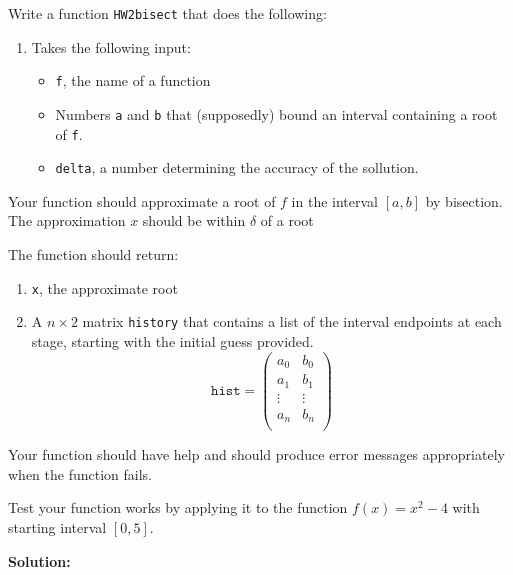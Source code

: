 \documentclass[12pt]{article}
\makeatletter
\theoremstyle{homework}
\newenvironment{exercise}[1]
{\def\@currentlabel{#1}\exercisecore}
{\endexercisecore}
\newcommand{\localhead}[1]{\par\smallskip\noindent\textbf{#1}\nobreak\\}%
\newcommand\solution{\localhead{Solution:}}
\makeatother
\begin{document}
\begin{exercise}{DM 4}
Write a function \texttt{HW2bisect} that does the following:
\begin{enumerate}
	\item Takes the following input:
	\begin{itemize}
		\item \texttt{f}, the name of a function
		\item Numbers \texttt{a} and \texttt{b} that (supposedly) bound an interval containing a root of \texttt{f}.
		\item \texttt{delta}, a number determining the accuracy of the sollution.
	\end{itemize}
\end{enumerate}
Your function should approximate a root of $f$ in the interval $[a,b]$ by 
bisection.  The approximation $x$ should be within $\delta$ of a root

The function should return:
\begin{enumerate}
	\item \texttt{x}, the approximate root
	\item A $n\times 2$ matrix \texttt{history} that contains
	a list of the interval endpoints at each stage, starting with the
	initial guess provided.
	\begin{equation}
	\mathtt{hist} = \begin{pmatrix} a_0 & b_0 \\
	a_1 & b_1 \\
	\vdots & \vdots \\
	a_n & b_n \\
	\end{pmatrix}
	\end{equation}
\end{enumerate}

Your function should have help and should produce error messages appropriately when the function fails.

Test your function works by applying it to the function $f(x)=x^2-4$ with starting interval $[0,5]$.
\end{exercise}

\solution
\end{document}
